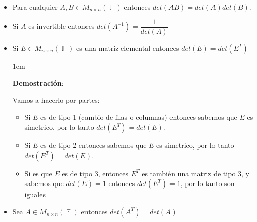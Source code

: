 \documentclass[12pt, fleqn]{report}                             %
\newenvironment{SmallIndentation}[1][0.75em]                    %
        {\begin{adjustwidth}{#1}{}\begin{footnotesize}}             %
        {\end{footnotesize}\end{adjustwidth}}                       %
\theoremstyle{break}                                            %
\DeclareMathOperator \GenericField {\mathbb{F}}                 %
\begin{document}
                \begin{itemize}

                    \item
                        Para cualquier $A, B \in M_{n \times n}(\GenericField)$
                        entonces $det(AB) = det(A) det(B)$.

                    \item
                        Si $A$ es invertible entonces $det(A^{-1}) = \dfrac{1}{det(A)}$

                    \item
                        Si $E \in M_{n \times n}(\GenericField)$ es una matriz elemental
                        entonces $det(E) = det(E^T)$

                        \begin{SmallIndentation}[1em]
                            \textbf{Demostración}:
                            
                            Vamos a hacerlo por partes:
                            \begin{itemize}
                                
                                \item 
                                    Si $E$ es de tipo 1 (cambio de filas o columnas) entonces
                                    sabemos que $E$ es simetrico, por lo tanto $det(E^T) = det(E)$.

                                \item 
                                    Si $E$ es de tipo 2 entonces sabemos que $E$ es simetrico,
                                    por lo tanto $det(E^T) = det(E)$.

                                \item
                                    Si es que $E$ es de tipo 3, entonces $E^T$ es también una matriz 
                                    de tipo 3, y sabemos que $det(E) = 1$ entonces $det(E^T) = 1$, por lo
                                    tanto son iguales 
                            \end{itemize}
                        
                        \end{SmallIndentation}
                            

                    \item
                        Sea $A \in M_{n \times n}(\GenericField)$
                        entonces $det(A^T) = det(A)$


\end{itemize}
\end{document}
